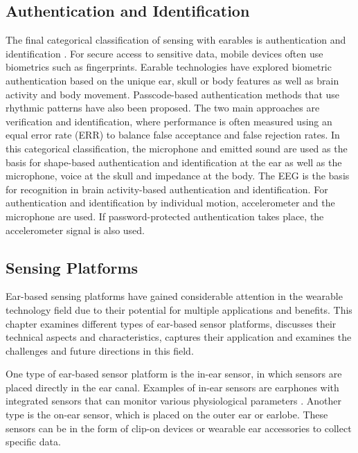 \subsection{Authentication and Identification}
\label{Background:SensingWithEarables:Authentication}
The final categorical classification of sensing with earables is authentication and identification \cite{roddigerSensingEarablesSystematic2022a}. 
For secure access to sensitive data, mobile devices often use biometrics such as fingerprints. 
Earable technologies have explored biometric authentication based on the unique ear, skull or body features as well as brain activity and body movement. 
Passcode-based authentication methods that use rhythmic patterns have also been proposed. 
The two main approaches are verification and identification, where performance is often measured using an equal error rate (ERR) to balance false acceptance and false rejection rates.
In this categorical classification, the microphone and emitted sound are used as the basis for shape-based authentication and identification at the ear as well as the microphone, voice at the skull and impedance at the body.
The EEG is the basis for recognition in brain activity-based authentication and identification.
For authentication and identification by individual motion, accelerometer and the microphone are used. 
If password-protected authentication takes place, the accelerometer signal is also used.

\subsection{Sensing Platforms}
\label{Background:SensingWithEarables:SensingPlatforms}
Ear-based sensing platforms have gained considerable attention in the wearable technology field due to their potential for multiple applications and benefits. 
This chapter examines different types of ear-based sensor platforms, discusses their technical aspects and characteristics, captures their application and examines the challenges and future directions in this field.

One type of ear-based sensor platform is the in-ear sensor, in which sensors are placed directly in the ear canal. Examples of in-ear sensors are earphones with integrated sensors that can monitor various physiological parameters \cite{maseHearablesNewPerspectives2020, bestbierDevelopmentVitalSigns2018, luekenPhotoplethysmographybasedInearSensor2017}. 
Another type is the on-ear sensor, which is placed on the outer ear or earlobe. 
These sensors can be in the form of clip-on devices or wearable ear accessories to collect specific data.

